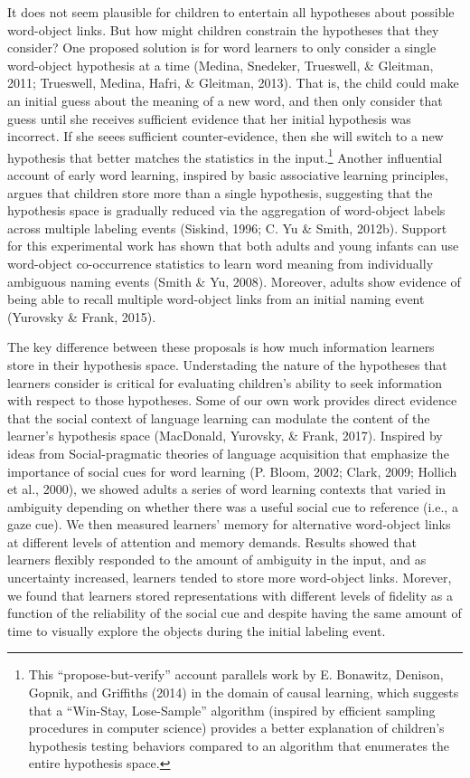 \documentclass[english,floatsintext,man]{apa6}
\theoremstyle{definition}
\theoremstyle{definition}
\theoremstyle{definition}
\theoremstyle{remark}
\begin{document}
It does not seem plausible for children to entertain all hypotheses
about possible word-object links. But how might children constrain the
hypotheses that they consider? One proposed solution is for word
learners to only consider a single word-object hypothesis at a time
(Medina, Snedeker, Trueswell, \& Gleitman, 2011; Trueswell, Medina,
Hafri, \& Gleitman, 2013). That is, the child could make an initial
guess about the meaning of a new word, and then only consider that guess
until she receives sufficient evidence that her initial hypothesis was
incorrect. If she seees sufficient counter-evidence, then she will
switch to a new hypothesis that better matches the statistics in the
input.\footnote{This \enquote{propose-but-verify} account parallels work
  by E. Bonawitz, Denison, Gopnik, and Griffiths (2014) in the domain of
  causal learning, which suggests that a \enquote{Win-Stay, Lose-Sample}
  algorithm (inspired by efficient sampling procedures in computer
  science) provides a better explanation of children's hypothesis
  testing behaviors compared to an algorithm that enumerates the entire
  hypothesis space.} Another influential account of early word learning,
inspired by basic associative learning principles, argues that children
store more than a single hypothesis, suggesting that the hypothesis
space is gradually reduced via the aggregation of word-object labels
across multiple labeling events (Siskind, 1996; C. Yu \& Smith, 2012b).
Support for this experimental work has shown that both adults and young
infants can use word-object co-occurrence statistics to learn word
meaning from individually ambiguous naming events (Smith \& Yu, 2008).
Moreover, adults show evidence of being able to recall multiple
word-object links from an initial naming event (Yurovsky \& Frank,
2015).

The key difference between these proposals is how much information
learners store in their hypothesis space. Understading the nature of the
hypotheses that learners consider is critical for evaluating children's
ability to seek information with respect to those hypotheses. Some of
our own work provides direct evidence that the social context of
language learning can modulate the content of the learner's hypothesis
space (MacDonald, Yurovsky, \& Frank, 2017). Inspired by ideas from
Social-pragmatic theories of language acquisition that emphasize the
importance of social cues for word learning (P. Bloom, 2002; Clark,
2009; Hollich et al., 2000), we showed adults a series of word learning
contexts that varied in ambiguity depending on whether there was a
useful social cue to reference (i.e., a gaze cue). We then measured
learners' memory for alternative word-object links at different levels
of attention and memory demands. Results showed that learners flexibly
responded to the amount of ambiguity in the input, and as uncertainty
increased, learners tended to store more word-object links. Morever, we
found that learners stored representations with different levels of
fidelity as a function of the reliability of the social cue and despite
having the same amount of time to visually explore the objects during
the initial labeling event.
\end{document}
